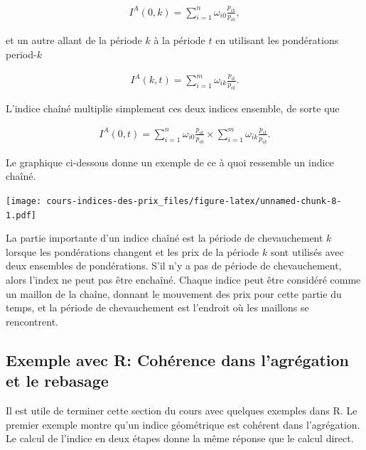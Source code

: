 \documentclass[
]{article}
\begin{document}
\begin{align*}
I^{A}(0, k) = \sum_{i = 1}^{n} \omega_{i0} \frac{p_{ik}}{p_{i0}},
\end{align*}

et un autre allant de la période \(k\) à la période \(t\) en utilisant les pondérations period-\(k\)

\begin{align*}
I^{A}(k, t) = \sum_{i = 1}^{m} \omega_{ik} \frac{p_{it}}{p_{ik}}.
\end{align*}

L'indice chaîné multiplie simplement ces deux indices ensemble, de sorte que

\begin{align*}
I^{A}(0, t) = \sum_{i = 1}^{n} \omega_{i0} \frac{p_{ik}}{p_{i0}} \times \sum_{i = 1}^{m} \omega_{ik} \frac{p_{it}}{p_{ik}}.
\end{align*}

Le graphique ci-dessous donne un exemple de ce à quoi ressemble un indice chaîné.

\texttt{[image: cours-indices-des-prix\_files/figure-latex/unnamed-chunk-8-1.pdf]}

La partie importante d'un indice chaîné est la période de chevauchement \(k\) lorsque les pondérations changent et les prix de la période \(k\) sont utilisés avec deux ensembles de pondérations. S'il n'y a pas de période de chevauchement, alors l'index ne peut pas être enchaîné. Chaque indice peut être considéré comme un maillon de la chaîne, donnant le mouvement des prix pour cette partie du temps, et la période de chevauchement est l'endroit où les maillons se rencontrent.

\hypertarget{exemple-avec-r-cohuxe9rence-dans-lagruxe9gation-et-le-rebasage}{%
\subsection{Exemple avec R: Cohérence dans l'agrégation et le rebasage}\label{exemple-avec-r-cohuxe9rence-dans-lagruxe9gation-et-le-rebasage}}

Il est utile de terminer cette section du cours avec quelques exemples dans R. Le premier exemple montre qu'un indice géométrique est cohérent dans l'agrégation. Le calcul de l'indice en deux étapes donne la même réponse que le calcul direct.
\end{document}
